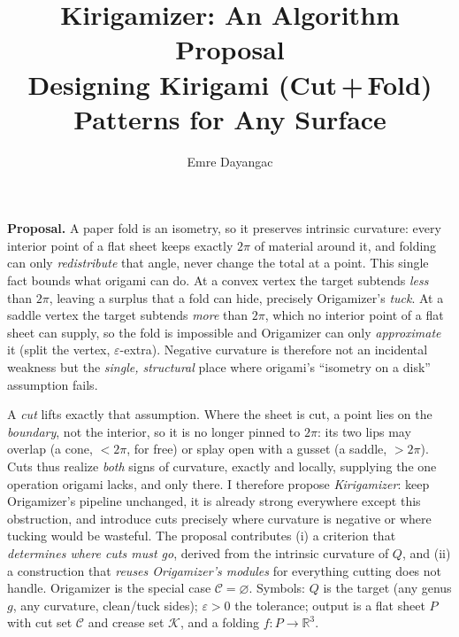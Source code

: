 \documentclass[11pt]{article}
\title{\textbf{Kirigamizer: An Algorithm Proposal}\\[2pt]
\large Designing Kirigami (Cut\,+\,Fold) Patterns for Any Surface}
\author{Emre Dayangac}
\date{}
\newcommand{\eps}{\varepsilon}
\newcommand{\cut}{\mathcal{C}}
\newcommand{\crease}{\mathcal{K}}
\begin{document}
\maketitle

\noindent
\textbf{Proposal.} A paper fold is an isometry, so it preserves intrinsic
curvature: every interior point of a flat sheet keeps exactly $2\pi$ of
material around it, and folding can only \emph{redistribute} that angle,
never change the total at a point. This single fact bounds what origami can
do. At a convex vertex the target subtends \emph{less} than $2\pi$, leaving
a surplus that a fold can hide, precisely Origamizer's \emph{tuck}. At a
saddle vertex the target subtends \emph{more} than $2\pi$, which no interior
point of a flat sheet can supply, so the fold is impossible and
Origamizer can only \emph{approximate} it (split the vertex, $\eps$-extra).
Negative curvature is therefore not an incidental weakness but the
\emph{single, structural} place where origami's ``isometry on a disk''
assumption fails.

A \emph{cut} lifts exactly that assumption. Where the sheet is cut, a point
lies on the \emph{boundary}, not the interior, so it is no longer pinned to
$2\pi$: its two lips may overlap (a cone, $<2\pi$, for free) or splay open
with a gusset (a saddle, $>2\pi$). Cuts thus realize \emph{both} signs of
curvature, exactly and locally, supplying the one operation origami
lacks, and only there. I therefore propose \emph{Kirigamizer}: keep
Origamizer's pipeline unchanged, it is already strong everywhere except
this obstruction, and introduce cuts precisely where curvature is
negative or where tucking would be wasteful. The proposal contributes
(i) a criterion that \emph{determines where cuts must go}, derived from the
intrinsic curvature of $Q$, and (ii) a construction that \emph{reuses
Origamizer's modules} for everything cutting does not handle. Origamizer is
the special case $\cut=\varnothing$.
Symbols: $Q$ is the target (any genus $g$, any curvature, clean/tuck
sides); $\eps>0$ the tolerance; output is a flat sheet $P$ with cut set
$\cut$ and crease set $\crease$, and a folding $f\colon P\to\mathbb{R}^3$.

\end{document}
